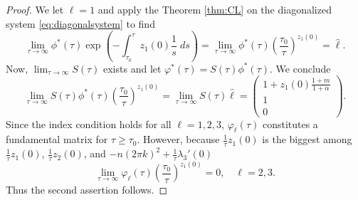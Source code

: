 \documentclass[a4paper,11pt]{article}
\theoremstyle{remark}
\begin{document}
\begin{proof}
We let $\ell=1$ and apply the Theorem \ref{thm:CL} on the diagonalized system \eqref{eq:diagonalsystem} to find
$$ \lim_{\tau \rightarrow \infty} \phi^*(\tau)\exp\left(-\int_{\tau_0}^\tau z_1(0)\frac{1}{s}\; ds\right) = \lim_{\tau \rightarrow \infty} \phi^*(\tau)\left(\frac{\tau_0}{\tau}\right)^{z_1(0)} = \hat{\ell}.$$
Now, $\displaystyle\lim_{\tau \rightarrow \infty} S(\tau)$ exists and let $\varphi^*(\tau) = S(\tau)\phi^*(\tau)$. We conclude
$$ \lim_{\tau \rightarrow \infty} S(\tau)\phi^*(\tau)\left(\frac{\tau_0}{\tau}\right)^{z_1(0)} = \lim_{\tau \rightarrow \infty}S(\tau)\hat{\ell} = \begin{pmatrix} 1+z_1(0)\frac{1+m}{1+\alpha}\\1\\0\end{pmatrix}.$$
Since the index condition holds for all $\ell=1,2,3$, $\varphi_\ell(\tau)$ constitutes a fundamental matrix for $\tau\ge\tau_0$. However, because $\frac{1}{\tau}z_1(0)$ is the biggest among $\frac{1}{\tau}z_1(0)$, $\frac{1}{\tau}z_2(0)$, and $-n(2\pi k)^2 + \frac{1}{\tau}\lambda_3'(0)$ 
$$ \lim_{\tau \rightarrow \infty} \varphi_\ell(\tau)\left(\frac{\tau_0}{\tau}\right)^{z_1(0)} = 0, \quad \ell=2,3.$$
Thus the second assertion follows.

\end{proof}
\end{document}
